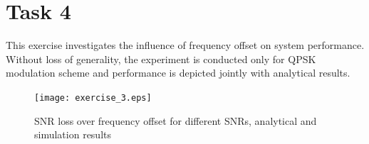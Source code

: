 \documentclass[a4paper,10pt]{paper}
\begin{document}
\newpage
\section{Task 4}
This exercise investigates the influence of frequency offset on system performance. Without loss of generality, the experiment is conducted only for QPSK modulation scheme and performance is depicted jointly with analytical results. 
\begin{figure}[thb]
\centering
\texttt{[image: exercise\_3.eps]}
\caption{SNR loss over frequency offset for different SNRs, analytical and simulation results}
\end{figure}
\end{document}

